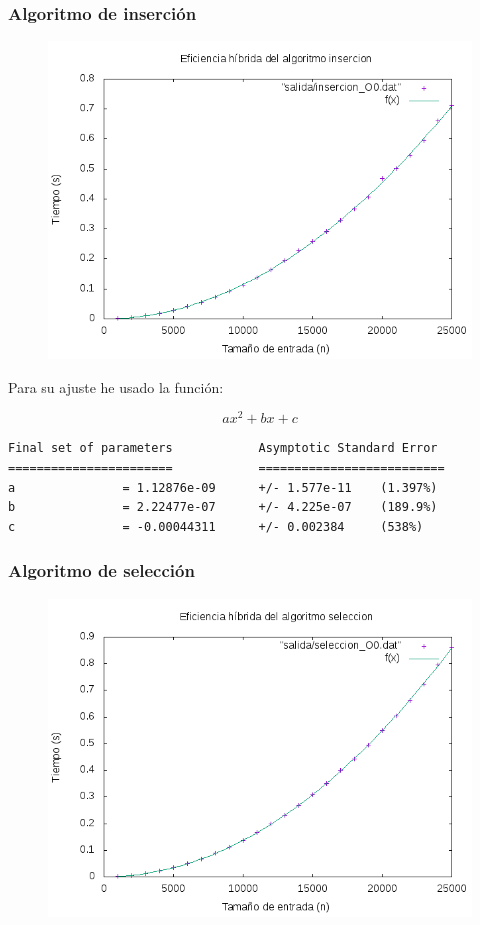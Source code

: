 \documentclass[spanish]{beamer}
\begin{document}
%
%

\begin{frame}\frametitle{Algoritmo de inserción}
  \begin{figure}[H]
    \centering   
        \includegraphics[clip,width=0.8\columnwidth]{../plots/insercion_O0_fit.png}%
    \end{figure}
\end{frame}

\begin{frame}[fragile]
  Para su ajuste he usado la función:

  $$ax^2+bx+c$$
  
\scriptsize
\begin{verbatim}
Final set of parameters            Asymptotic Standard Error
=======================            ==========================
a               = 1.12876e-09      +/- 1.577e-11    (1.397%)
b               = 2.22477e-07      +/- 4.225e-07    (189.9%)
c               = -0.00044311      +/- 0.002384     (538%)
\end{verbatim}

\end{frame}


%
%

\begin{frame}\frametitle{Algoritmo de selección}
  \begin{figure}[H]
    \centering   
        \includegraphics[clip,width=0.8\columnwidth]{../plots/seleccion_O0_fit.png}%
    \end{figure}
  \end{frame}
\end{document}
